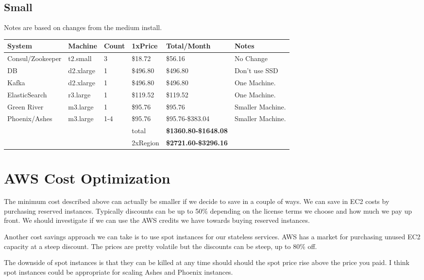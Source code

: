 \documentclass[11pt]{article}
\begin{document}
\subsection{Small}

Notes are based on changes from the medium install.

\begin{center}
    \begin{tabular}{| l l l l | l | p{3cm} |}
        \hline
        System & Machine & Count & 1xPrice & Total/Month & Notes \\
        \hline \hline
        Consul/Zookeeper & t2.small & 3 & \$18.72 & \$56.16 & No Change\\ \hline
        DB & d2.xlarge & 1 & \$496.80 & \$496.80 & Don't use SSD\\ \hline
        Kafka & d2.xlarge & 1 & \$496.80 & \$496.80 & One Machine.\\ \hline
        ElasticSearch & r3.large & 1 & \$119.52 & \$119.52 & One Machine.\\ \hline
        Green River & m3.large & 1 & \$95.76 & \$95.76 & Smaller Machine.\\ \hline
        Phoenix/Ashes & m3.large & 1-4 & \$95.76 & \$95.76-\$383.04 & Smaller Machine.\\ \hline
        & & & total & {\bf \$1360.80-\$1648.08} & \\ \hline
        & & & 2xRegion & {\bf \$2721.60-\$3296.16} & \\ \hline
    \end{tabular}
\end{center}

\section{AWS Cost Optimization}

The minimum cost described above can actually be smaller if we decide to save in a couple of ways. 
We can save in EC2 costs by purchasing reserved instances. Typically discounts can be
up to 50\% depending on the license terms we choose and how much we pay
up front. We should investigate if we can use the AWS credits we have towards
buying reserved instances.

Another cost savings approach we can take is to use spot instances for our stateless
services. AWS has a market for purchasing unused EC2 capacity at a steep discount.
The prices are pretty volatile but the discounts can be steep, up to 80\% off.

The downside of spot instances is that they can be killed at any time should should
the spot price rise above the price you paid. I think spot instances could be 
appropriate for scaling Ashes and Phoenix instances.
\end{document}
